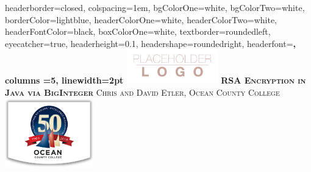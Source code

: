 \documentclass[landscape,a0paper,fontscale=.46]{baposter} %
\begin{document}
\begin{poster}
{
headerborder=closed, %
colspacing=1em, %
bgColorOne=white, %
bgColorTwo=white, %
borderColor=lightblue, %
headerColorOne=white, %
headerColorTwo=white, %
headerFontColor=black, %
boxColorOne=white, %
textborder=roundedleft, %
eyecatcher=true, %
headerheight=0.1\textheight, %
headershape=roundedright, %
headerfont=\Large\bf\textsc, %
columns =5,
linewidth=2pt %
}
%
{\includegraphics[height=4em]{logo.png}} %
{\bf\textsc{RSA Encryption in Java via BigInteger}\vspace{0.5em}} %
{\textsc{ Chris and David Etler,  \hspace{12pt} Ocean County College}} %
{\includegraphics[height=8em]{occ.png}} %


\end{poster}
\end{document}
